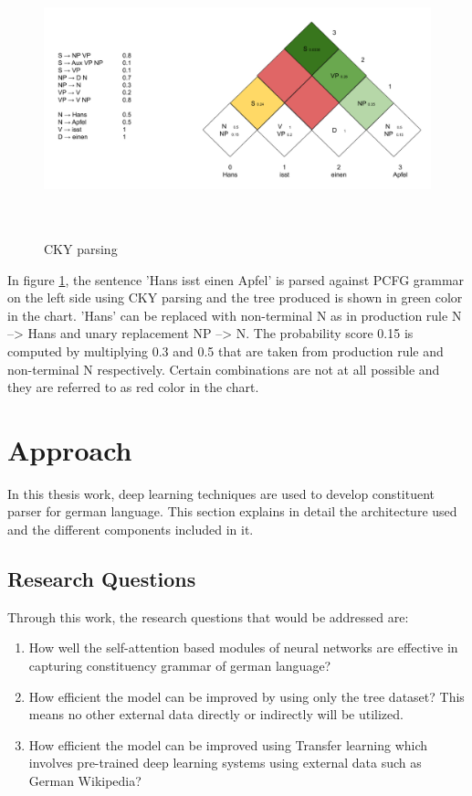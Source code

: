 \documentclass[a4paper, 11pt]{article}
\begin{document}
\begin{figure}[H]
    \centering
    \includegraphics[width=\textwidth,height=8cm,keepaspectratio=true]
    {cky-parsing-chart-2.png}
    \caption{
        CKY parsing
    }
    \label{fig:cky_parser_2}
\end{figure}

In figure \ref{fig:cky_parser_2}, the sentence 'Hans isst einen Apfel' is parsed against PCFG grammar on the left side using CKY parsing and the tree produced is shown in green color in the chart. 'Hans' can be replaced with non-terminal N as in production rule N --> Hans and unary replacement NP --> N. The probability score 0.15 is computed by multiplying 0.3 and 0.5 that are taken from production rule and non-terminal N respectively. Certain combinations are not at all possible and they are referred to as red color in the chart. 

\pagebreak
\section{Approach}  

In this thesis work, deep learning techniques are used to develop constituent parser for german language. This section explains in detail the architecture used and the different components included in it. 

\subsection{Research Questions}

Through this work, the research questions that would be addressed are:
\begin{enumerate}
\item How well the self-attention based modules of neural networks are effective in capturing constituency grammar of german language? 
\item How efficient the model can be improved by using only the tree dataset? This means no other external data directly or indirectly will be utilized. 
\item How efficient the model can be improved using Transfer learning which involves pre-trained deep learning systems using external data such as German Wikipedia?
\end{enumerate}
\end{document}

